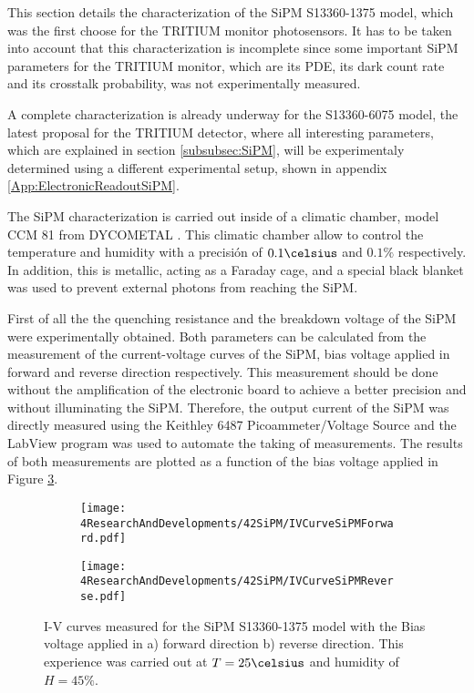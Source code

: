 This section details the characterization of the SiPM S13360-1375 model, which was the first choose for the TRITIUM monitor photosensors. It has to be taken into account that this characterization is incomplete since some important SiPM parameters for the TRITIUM monitor, which are its PDE, its dark count rate and its crosstalk probability, was not experimentally measured. 

A complete characterization is already underway for the S13360-6075 model, the latest proposal for the TRITIUM detector, where all interesting parameters, which are explained in section \ref{subsubsec:SiPM}, will be experimentaly determined using a different experimental setup, shown in appendix \ref{App:ElectronicReadoutSiPM}.

The SiPM characterization is carried out inside of a climatic chamber, model CCM 81 from DYCOMETAL \cite{ClimaticChamberIFIMED}. This climatic chamber allow to control the temperature and humidity with a precisión of $0.1\celsius$ and $0.1\%$ respectively. In addition, this is metallic, acting as a Faraday cage, and a special black blanket \cite{BlackBlancket} was used to prevent external photons from reaching the SiPM.

First of all the the quenching resistance and the breakdown voltage of the SiPM were experimentally obtained. Both parameters can be calculated from the measurement of the current-voltage curves of the SiPM, bias voltage applied in forward and reverse direction respectively. This measurement should be done without the amplification of the electronic board to achieve a better precision and without illuminating the SiPM. Therefore, the output current of the SiPM was directly measured using the Keithley 6487 Picoammeter/Voltage Source \cite{DataSheetKeithley6487} and the LabView program was used to automate the taking of measurements. The results of both measurements are plotted as a function of the bias voltage applied in Figure \ref{fig:IVcurveSiPM}.

\begin{figure}
\centering
    \begin{subfigure}[b]{0.9\textwidth}
    \centering
    \texttt{[image: 4ResearchAndDevelopments/42SiPM/IVCurveSiPMForward.pdf]}  
    \caption{\label{subfig:IVcurveForward}}
    \end{subfigure}
    \hfill
    \begin{subfigure}[b]{0.9\textwidth}
    \centering
    \texttt{[image: 4ResearchAndDevelopments/42SiPM/IVCurveSiPMReverse.pdf]}  
    \caption{\label{subfig:IVcurveReverse}}
    \end{subfigure}
 \caption{I-V curves measured for the SiPM S13360-1375 model with the Bias voltage applied in a) forward direction b) reverse direction. This experience was carried out at $T=25\celsius$ and humidity of $H=45\%$.}
 \label{fig:IVcurveSiPM}
\end{figure}

